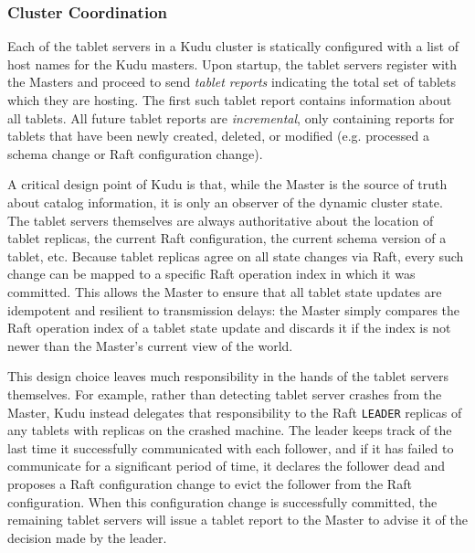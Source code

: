 \documentclass[twocolumn,9pt]{article}
\begin{document}
\subsubsection{Cluster Coordination}
\label{sec:cluster_coordination}

Each of the tablet servers in a Kudu cluster is statically configured with a list of host names
for the Kudu masters. Upon startup, the tablet servers register with the Masters and proceed to send
{\em tablet reports} indicating the total set of tablets which they are hosting.
The first such tablet report contains information about all tablets. All future tablet
reports are {\em incremental}, only containing reports for tablets that have been
newly created, deleted, or modified (e.g. processed a schema change or Raft configuration
change).

A critical design point of Kudu is that, while the Master is the source of truth about
catalog information, it is only an observer of the dynamic cluster state.
The tablet servers themselves are always authoritative about the location of tablet
replicas, the current Raft configuration, the current schema version of a tablet, etc.
Because tablet replicas agree on all state changes via Raft, every such change
can be mapped to a specific Raft operation index in which it was committed. This allows
the Master to ensure that all tablet state updates are idempotent
and resilient to transmission delays: the Master simply compares the Raft operation index
of a tablet state update and discards it if the index is not newer than the Master's current
view of the world.

This design choice leaves much responsibility in the hands of the tablet servers themselves.
For example, rather than detecting tablet server crashes from the Master, Kudu instead
delegates that responsibility to the Raft {\tt LEADER} replicas of any tablets with replicas
on the crashed machine. The leader keeps track
of the last time it successfully communicated with each follower, and if it has failed
to communicate for a significant period of time, it declares the follower dead and proposes
a Raft configuration change to evict the follower from the Raft configuration. When this
configuration change is successfully committed, the remaining tablet servers will
issue a tablet report to the Master to advise it of the decision made by the leader.
\end{document}
